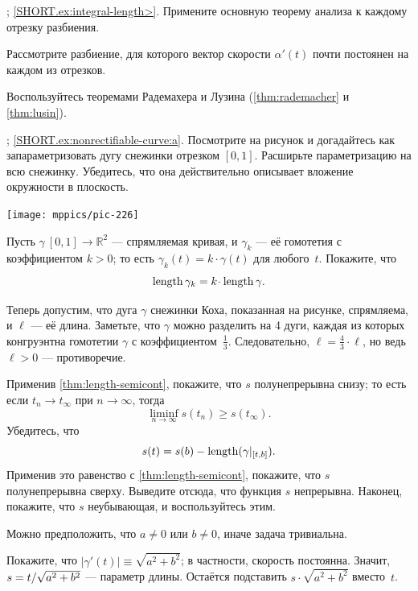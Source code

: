 \begin{multicols}{2}
\parbf{\ref{ex:integral-length}}; \ref{SHORT.ex:integral-length>}.
Примените основную теорему анализа к каждому отрезку разбиения.

Рассмотрите разбиение, для которого вектор скорости $\alpha'(t)$ почти постоянен на каждом из отрезков.

Воспользуйтесь теоремами Радемахера и Лузина (\ref{thm:rademacher} и \ref{thm:lusin}).

\parbf{\ref{ex:nonrectifiable-curve}}; \ref{SHORT.ex:nonrectifiable-curve:a}.
Посмотрите на рисунок и догадайтесь как запараметризовать дугу снежинки отрезком $[0,1]$.
Расширьте параметризацию на всю снежинку.
Убедитесь, что она действительно описывает вложение окружности в плоскость.

\begin{Figure}
\vskip-0mm
\centering
\texttt{[image: mppics/pic-226]}
\vskip0mm
\end{Figure}

Пусть $\gamma\:[0,1]\to\mathbb{R}^2$ --- спрямляемая кривая, и $\gamma_k$ --- её гомотетия с коэффициентом $k>0$;
то есть $\gamma_k(t)=k\cdot\gamma(t)$ для любого~$t$.
Покажите, что 
\[\length\gamma_k=k\cdot\length \gamma.\]

Теперь допустим, что дуга $\gamma$ снежинки Коха, показанная на рисунке, спрямляема,
и $\ell$ --- её длина.
Заметьте, что $\gamma$ можно разделить на 4 дуги, каждая из которых конгруэнтна гомотетии $\gamma$ с коэффициентом~$\tfrac13$.
Следовательно, $\ell=\tfrac43\cdot\ell$,
но ведь $\ell>0$ --- противоречие.

Применив \ref{thm:length-semicont}, покажите, что $s$ полунепрерывна снизу;
то есть если $t_n\to t_\infty$ при $n\to\infty$, тогда 
\[\liminf_{n\to\infty} s(t_n)\ge s(t_\infty).\]
Убедитесь, что
\[s(t)=s(b)-\mathop{\rm length}\nolimits(\gamma|_{[t,b]}).\]
Применив это равенство с \ref{thm:length-semicont}, покажите, что $s$ полунепрерывна сверху.
Выведите отсюда, что функция $s$ непрерывна.
Наконец, покажите, что $s$ неубывающая, 
и воспользуйтесь этим.

Можно предположить, что $a\ne 0$ или $b\ne 0$,
иначе задача тривиальна.

Покажите, что $|\gamma'(t)|\equiv \sqrt{a^2+b^2}$;
в частности, скорость постоянна.
Значит, $s\z=t/\sqrt{a^2+b^2}$ --- параметр длины.
Остаётся подставить $s\cdot \sqrt{a^2+b^2}$ вместо~$t$.



\end{multicols}

